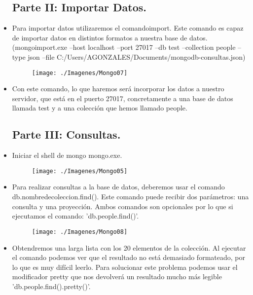 \begin{itemize}
	\subsection{Parte II: Importar Datos.}
		\item Para importar datos utilizaremos el comandoimport. Este comando es capaz de importar datos en distintos formatos a nuestra base de datos.
(mongoimport.exe --host localhost --port 27017 --db test --collection people --type json --file C:/Users/AGONZALES/Documents/mongodb-consultas.json)
			\begin{figure}[htb]
				\begin{center}
					\texttt{[image: ./Imagenes/Mongo07]}
				\end{center}
			\end{figure}
		\item Con este comando, lo que haremos será incorporar los datos a nuestro servidor, que está en el puerto 27017, concretamente a una base de datos llamada test y a una colección que hemos llamado people.

	\subsection{Parte III: Consultas.}
		\item Iniciar el shell de mongo mongo.exe. 
			\begin{figure}[htb]
				\begin{center}
					\texttt{[image: ./Imagenes/Mongo05]}
				\end{center}
			\end{figure}
			\vspace{3cm}
		\item Para realizar consultas a la base de datos, deberemos usar el comando db.nombredecoleccion.find(). Este comando puede recibir dos parámetros: una consulta y una proyección. Ambos comandos son opcionales por lo que si ejecutamos el comando: 'db.people.find()'.
			\begin{figure}[htb]
				\begin{center}
					\texttt{[image: ./Imagenes/Mongo08]}
				\end{center}
			\end{figure}
		\item Obtendremos una larga lista con los 20 elementos de la colección. Al ejecutar el comando podemos ver que el resultado no está demasiado formateado, por lo que es muy difícil leerlo. Para solucionar este problema podemos usar el modificador pretty que nos devolverá un resultado mucho más legible 'db.people.find().pretty()'.


\end{itemize}
